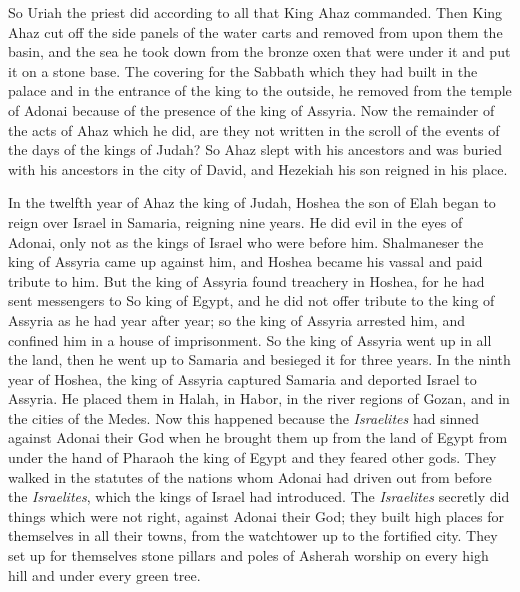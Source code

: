 \begin{biblechapter}
\verse So Uriah the priest did according to all that King Ahaz commanded.
\verse Then King Ahaz cut off the side panels of the water carts and removed from upon them the basin, and the sea he took down from the bronze oxen that were under it and put it on a stone base.
\verse The covering for the Sabbath which they had built in the palace and in the entrance of the king to the outside, he removed from the temple of Adonai because of the presence of the king of Assyria.
\verse Now the remainder of the acts of Ahaz which he did, are they not written in the scroll of the events of the days of the kings of Judah?
\verse So Ahaz slept with his ancestors and was buried with his ancestors in the city of David, and Hezekiah his son reigned in his place.
\end{biblechapter}

\begin{biblechapter} %
 In the twelfth year of Ahaz the king of Judah, Hoshea the son of Elah began to reign over Israel in Samaria, reigning nine years.
\verse He did evil in the eyes of Adonai, only not as the kings of Israel who were before him.
\verse Shalmaneser the king of Assyria came up against him, and Hoshea became his vassal and paid tribute to him.
\verse But the king of Assyria found treachery in Hoshea, for he had sent messengers to So king of Egypt, and he did not offer tribute to the king of Assyria as he had year after year; so the king of Assyria arrested him, and confined him in a house of imprisonment.
\verse So the king of Assyria went up in all the land, then he went up to Samaria and besieged it for three years.
 In the ninth year of Hoshea, the king of Assyria captured Samaria and deported Israel to Assyria. He placed them in Halah, in Habor, in the river regions of Gozan, and in the cities of the Medes.
\verse Now this happened because the \textit{Israelites} had sinned against Adonai their God when he brought them up from the land of Egypt from under the hand of Pharaoh the king of Egypt and they feared other gods.
\verse They walked in the statutes of the nations whom Adonai had driven out from before the \textit{Israelites}, which the kings of Israel had introduced.
\verse The \textit{Israelites} secretly did things which were not right, against Adonai their God; they built high places for themselves in all their towns, from the watchtower up to the fortified city.
\verse They set up for themselves stone pillars and poles of Asherah worship on every high hill and under every green tree.

\end{biblechapter}

